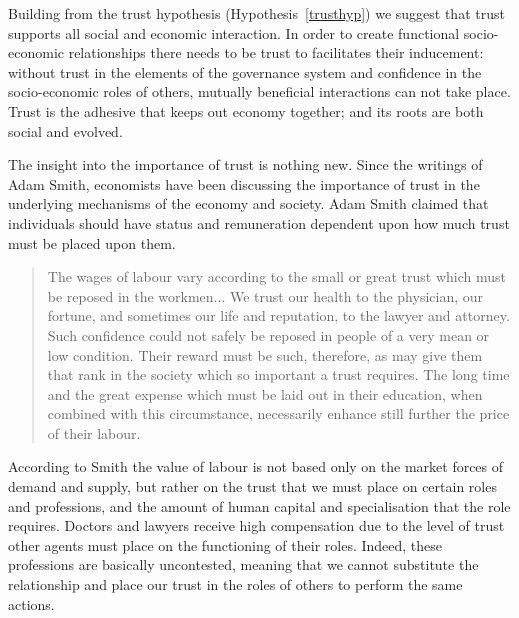 \begin{subappendices}
Building from the trust hypothesis (Hypothesis~\ref{trusthyp}) we suggest that trust supports all social and economic interaction. In order to create functional socio-economic relationships there needs to be trust to facilitates their inducement: without trust in the elements of the governance system and confidence in the socio-economic roles of others, mutually beneficial interactions can not take place. Trust is the adhesive that keeps out economy together; and its roots are both social and evolved.

The insight into the importance of trust is nothing new. Since the writings of Adam Smith, economists have been discussing the importance of trust in the underlying mechanisms of the economy and society. Adam Smith claimed that individuals should have status and remuneration dependent upon how much trust must be placed upon them. 

\begin{quote}
The wages of labour vary according to the small or great trust which must be reposed in the workmen... We trust our health to the physician, our fortune, and sometimes our life and reputation, to the lawyer and attorney. Such confidence could not safely be reposed in people of a very mean or low condition. Their reward must be such, therefore, as may give them that rank in the society which so important a trust requires. The long time and the great expense which must be laid out in their education, when combined with this circumstance, necessarily enhance still further the price of their labour.

\begin{flushright}
\citet[p.~91]{Smith1776}
\end{flushright}
\end{quote}

According to Smith the value of labour is not based only on the market forces of demand and supply, but rather on the trust that we must place on certain roles and professions, and the amount of human capital and specialisation that the role requires. Doctors and lawyers receive high compensation due to the level of trust other agents must place on the functioning of their roles. Indeed, these professions are basically uncontested, meaning that we cannot substitute the relationship and place our trust in the roles of others to perform the same actions.


\end{subappendices}
